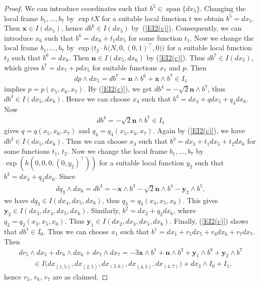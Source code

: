 \documentclass[pdftex]{sigma}
\numberwithin{equation}{section}
\newcommand\bx{{\mathbf x}}
\newcommand\by{{\mathbf y}}
\newcommand\bn{{\mathbf n}}
\newcommand{\Span}{\operatorname{span}}
\begin{document}
\begin{proof} We can introduce coordinates such that $b^5\in\Span\{dx_5\}$. Changing the local frame $b_1,\dots , b_7$ by $\exp tX$ for a suitable local function $t$ we obtain $b^5=dx_5$. Then $\bx\in I(dx_5)$, hence $db^6\in I(dx_5)$ by~(\ref{EI2(c)}). Consequently, we can introduce $x_6$ such that $b^6 =dx_6 + t_1 dx_5$ for some function $t_1$. Now we change the local frame $b_1,\dots,b_7$ by $\exp \big(t_2\cdot h\big(N,0,(0,1)^\top,0\big)\big)$ for a suitable local function $t_2$ such that $b^6=dx_6$. Then $\bn\in I(dx_5,dx_6)$ by (\ref{EI2(c)}).
Thus $db^7\in I(dx_5)$, which gives $b^7=dx_7+pdx_5$ for suitable functions $x_7$ and $p$. Then
\begin{gather*}dp\wedge dx_5=db^7=\bn\wedge b^6+ \bx\wedge b^7 \in I_1\end{gather*}
implies $p=p(x_5,x_6,x_7)$. By (\ref{EI2(c)}), we get $db^4=-\sqrt 2 \bn\wedge b^7$, thus $db^4\in I(dx_5, dx_6)$. Hence we can choose $x_4$ such that $b^4=dx_4+ qdx_5+q_4dx_6$. Now
\begin{gather*}db^4=-\sqrt 2 \bn\wedge b^7\in I_1\end{gather*} gives $q=q(x_5,x_6,x_7)$ and $q_4=q_4(x_5,x_6,x_7)$. Again by (\ref{EI2(c)}), we have $db^3\in I(dx_5,dx_6)$. Thus we can choose $x_3$ such that $b^3=dx_3+t_1dx_5+t_2 dx_6$ for some functions $t_1$, $t_2$. Now we change the local frame $b_1,\dots,b_7$ by $\exp (h(0,0,0,(0,y_2)^\top))$ for a suitable local function $y_2$ such that $b^3=dx_3+q_3dx_6$. Since
\begin{gather*}dq_3\wedge dx_6=db^3=-\bx\wedge b^3 -\sqrt 2\bn\wedge b^4-\by_2\wedge b^5,\end{gather*}
we have $dq_3\in I(dx_4,dx_5, dx_6)$, thus $q_3=q_3(x_4,x_5,x_6)$. This gives $\by_2\in I(dx_3,dx_4,dx_5,dx_6)$.
Similarly, $b^2=dx_2+q_2dx_6$, where $q_2=q_2(x_3,x_5,x_6)$. Thus $\by_1\in I(dx_2,dx_3,dx_5,dx_6)$. Finally, (\ref{EI2(c)}) shows that $db^1\in I_0$. Thus we can choose $x_1$ such that $b^1=dx_1+ r_5dx_5+r_6dx_6+r_7dx_7$. Then
\begin{gather*}
 dr_5\wedge dx_5+dr_6\wedge dx_6+dr_7\wedge dx_7= -3\bx\wedge b^1+\bn\wedge b^2+\by_1\wedge b^6+\by_2\wedge b^7 \\
\qquad{} \in I\big( dx_{(1,5)}, dx_{(2,5)}, dx_{(2,6)}, dx_{(4,5)}, dx_{(4,7)}\big)+ dx_3\wedge I_0 +I_1,
\end{gather*}
hence $r_5$, $r_6$, $r_7$ are as claimed.


\end{proof}
\end{document}
